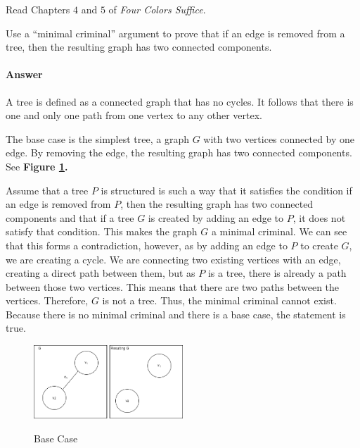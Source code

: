 \documentclass{article}
\begin{document}
 

Read Chapters $4$ and $5$ of \emph{Four Colors Suffice}.

Use a ``minimal criminal'' argument to prove that if an edge is removed from a
tree, then the resulting graph has two connected components.

        \paragraph{Answer}

	A tree is defined as a connected graph that has no cycles. It follows that there is one and only one path from one vertex to any other vertex.
	
	The base case is the simplest tree, a graph $G$ with two vertices connected by one edge. By removing the edge, the resulting graph has two connected components. See \textbf{Figure \ref{graph}.}
	
	Assume that a tree $P$ is structured is such a way that it satisfies the condition if an edge is removed from $P$, then the resulting graph has 
	two connected components and that if a tree $G$ is created by adding an edge to $P$, it does not satisfy that condition. This makes the graph $G$ a
	minimal criminal. We can see that this forms a contradiction, however, as by adding an edge to $P$ to create $G$, we are creating a cycle. We are 
	connecting two existing vertices with an edge, creating a direct path between them, but as $P$ is a tree, there is already a path between those two vertices.
	This means that there are two paths between the vertices. Therefore, $G$ is not a tree. Thus, the minimal criminal cannot exist.
	Because there is no minimal criminal and there is a base case, the statement is true.

 \begin{figure}
\caption{Base Case}
\centering
\includegraphics[width=0.5\textwidth]{images/graphBaseCase}
\label{graph}
\end{figure}
\end{document}
